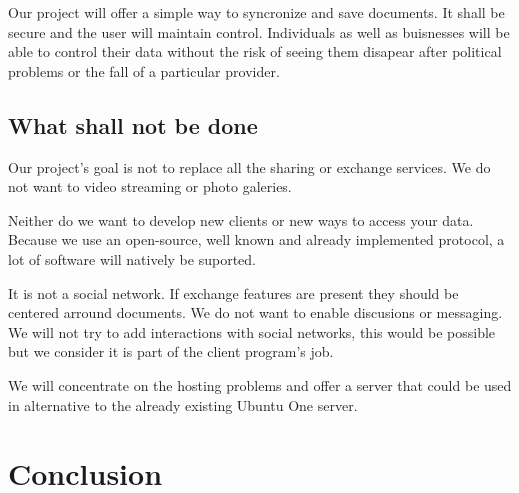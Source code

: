 \documentclass[12pt]{report}
\begin{document}
Our project will offer a simple way to syncronize and save documents. It shall be secure and the user will maintain control. Individuals as well as buisnesses will be able to control their data without the risk of seeing them disapear after political problems or the fall of a particular provider.

\section{What shall not be done}

Our project's goal is not to replace all the sharing or exchange services. We do not want to video streaming or photo galeries.

Neither do we want to develop new clients or new ways to access your data. Because we use an open-source, well known and already implemented protocol, a lot of software will natively be suported.

It is not a social network. If exchange features are present they should be centered arround documents. We do not want to enable discusions or messaging. We will not try to add interactions with social networks, this would be possible but we consider it is part of the client program's job.

We will concentrate on the hosting problems and offer a server that could be used in alternative to the already existing Ubuntu One server.

\chapter{Conclusion}
\thispagestyle{EIP}


\end{document}
